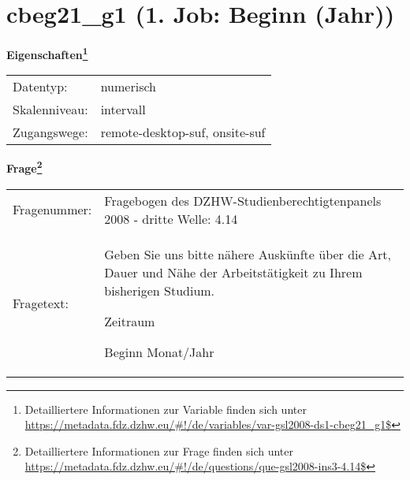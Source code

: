 
    \setcounter{footnote}{0}

    \vspace*{-1.8cm}
	\section{cbeg21\_g1 (1. Job: Beginn (Jahr))}
	\label{section:cbeg21_g1}



    \vspace*{0.5cm}
    \noindent\textbf{Eigenschaften\footnote{Detailliertere Informationen zur Variable finden sich unter
		\url{https://metadata.fdz.dzhw.eu/\#!/de/variables/var-gsl2008-ds1-cbeg21_g1$}}}\\
	\begin{tabularx}{\hsize}{@{}lX}
	Datentyp: & numerisch \\
	Skalenniveau: & intervall \\
	Zugangswege: &
	  remote-desktop-suf, 
	  onsite-suf
 \\
    \end{tabularx}



				\vspace*{0.5cm}
                \noindent\textbf{Frage\footnote{Detailliertere Informationen zur Frage finden sich unter
		              \url{https://metadata.fdz.dzhw.eu/\#!/de/questions/que-gsl2008-ins3-4.14$}}}\\
				\begin{tabularx}{\hsize}{@{}lX}
					Fragenummer: &
					  Fragebogen des DZHW-Studienberechtigtenpanels 2008 - dritte Welle:
					  4.14
 \\
					Fragetext: & Geben Sie uns bitte nähere Auskünfte über die Art, Dauer und Nähe der Arbeitstätigkeit zu Ihrem bisherigen Studium.\par  Zeitraum\par  Beginn Monat/Jahr \\
				\end{tabularx}





